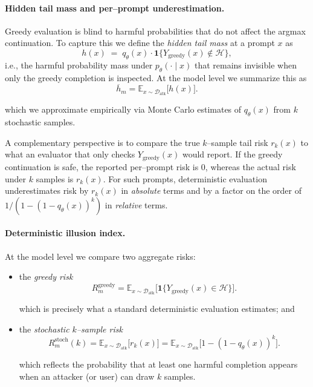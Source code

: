 \paragraph{Hidden tail mass and per–prompt underestimation.}
Greedy evaluation is blind to harmful probabilities that do not affect
the argmax continuation.
To capture this we define the \emph{hidden tail mass} at a prompt $x$ as
\[
  h(x)
  \;=\;
  q_\theta(x) \cdot
  \mathbf{1}\big\{ Y_{\text{greedy}}(x) \notin \mathcal{H} \big\},
\]
i.e., the harmful probability mass under $p_\theta(\cdot \mid x)$ that
remains invisible when only the greedy completion is inspected.
At the model level we summarize this as
\[
  \overline{h}_m
  =
  \mathbb{E}_{x \sim \mathcal{D}_{\text{atk}}}
  \big[ h(x) \big].
\]

which we approximate empirically via Monte Carlo estimates of
$q_\theta(x)$ from $k$ stochastic samples.

A complementary perspective is to compare the true $k$–sample tail risk
$r_k(x)$ to what an evaluator that only checks $Y_{\text{greedy}}(x)$
would report.
If the greedy continuation is safe, the reported per–prompt risk is
$0$, whereas the actual risk under $k$ samples is $r_k(x)$.
For such prompts, deterministic evaluation underestimates risk by
$r_k(x)$ in \emph{absolute} terms and by a factor on the order of
$1 / (1 - (1 - q_\theta(x))^k)$ in \emph{relative} terms.

\paragraph{Deterministic illusion index.}
At the model level we compare two aggregate risks:

\begin{itemize}[leftmargin=1.5em]
  \item the \emph{greedy risk}
\[
  R^{\text{greedy}}_m
  =
  \mathbb{E}_{x \sim \mathcal{D}_{\text{atk}}}
  \big[ \mathbf{1}\{ Y_{\text{greedy}}(x) \in \mathcal{H} \} \big].
\]

  which is precisely what a standard deterministic evaluation
  estimates; and

  \item the \emph{stochastic $k$--sample risk}
\[
  R^{\text{stoch}}_m(k)
  =
  \mathbb{E}_{x \sim \mathcal{D}_{\text{atk}}}
  \big[ r_k(x) \big]
  =
  \mathbb{E}_{x \sim \mathcal{D}_{\text{atk}}}
  \big[ 1 - (1 - q_\theta(x))^k \big].
\]

  which reflects the probability that at least one harmful completion
  appears when an attacker (or user) can draw $k$ samples.
\end{itemize}

